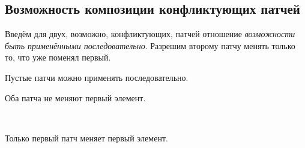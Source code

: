 \subsection{Возможность композиции конфликтующих патчей}

Введём для двух, возможно, конфликтующих, патчей отношение
\emph{возможности быть применёнными последовательно}. Разрешим второму
патчу менять только то, что уже поменял первый. 
    
\begin{code}%
\>[0]\<[2]%
\>[2]  \AgdaSymbol{:}  \AgdaSymbol{\{}\AgdaSymbol{\}\{}  \AgdaSymbol{:}  \AgdaSymbol{\}}          \<[71]%
\>[71]\<%
\end{code}

Пустые патчи можно применять последовательно. 

\begin{code}%
\>[2]\<[4]%
\>[4] \AgdaSymbol{:}   \<%
\end{code}

Оба патча не меняют первый элемент. 

\begin{code}%
\>[2]\<[4]%
\>[4] \AgdaSymbol{:}  \AgdaSymbol{\{}\AgdaSymbol{\}\{}  \AgdaSymbol{:}  \AgdaSymbol{\}} \AgdaSymbol{\{} \AgdaSymbol{:}  \AgdaSymbol{\}} \AgdaSymbol{\{} \AgdaSymbol{:}  \AgdaSymbol{\}}\<%
\\
\>[4]\<[6]%
\>[6] \AgdaSymbol{(}  \AgdaSymbol{)}  \AgdaSymbol{(} \AgdaSymbol{)}  \AgdaSymbol{(} \AgdaSymbol{)}\<%
\end{code}

Только первый патч меняет первый элемент.

